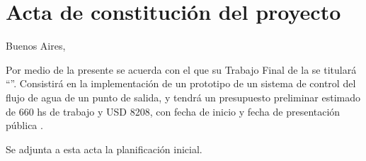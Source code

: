 \documentclass[
11pt, %
codirector, %
]{charter}
\begin{document}
\section*{Acta de constitución del proyecto}
\label{sec:acta}

\begin{flushright}
Buenos Aires, \fechaInicioName
\end{flushright}

\vspace{2cm}

Por medio de la presente se acuerda con el \authorname\hspace{1px} que su Trabajo Final de la \degreename\hspace{1px} se titulará ``\ttitle''. Consistirá en la implementación de un prototipo de un sistema de control del flujo de agua de un punto de salida, y tendrá un presupuesto preliminar estimado de 660 hs de trabajo y USD 8208, con fecha de inicio \fechaInicioName\hspace{1px} y fecha de presentación pública \fechaFinalName.

Se adjunta a esta acta la planificación inicial.

\vfill
\end{document}
